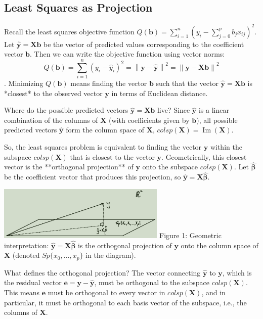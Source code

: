 \documentclass[11pt, letterpaper]{article}
\theoremstyle{definition}
\newcommand{\norm}[1]{\left\lVert#1\right\rVert}
\newcommand{\mat}[1]{\mathbf{#1}} %
\newcommand{\vect}[1]{\mathbf{#1}} %
\DeclareMathOperator{\im}{Im}       %
\begin{document}
\subsection{Least Squares as Projection}

Recall the least squares objective function $Q(\vect{b}) = \sum_{i=1}^{n} (y_i - \sum_{j=0}^{p} b_j x_{ij})^2$. Let $\hat{\vect{y}} = \mat{X}\vect{b}$ be the vector of predicted values corresponding to the coefficient vector $\vect{b}$. Then we can write the objective function using vector norms:
\[
Q(\vect{b}) = \sum_{i=1}^{n} (y_i - \hat{y}_i)^2 = \norm{\vect{y} - \hat{\vect{y}}}^2 = \norm{\vect{y} - \mat{X}\vect{b}}^2
\].
Minimizing $Q(\vect{b})$ means finding the vector $\vect{b}$ such that the vector $\hat{\vect{y}} = \mat{X}\vect{b}$ is *closest* to the observed vector $\vect{y}$ in terms of Euclidean distance.

Where do the possible predicted vectors $\hat{\vect{y}} = \mat{X}\vect{b}$ live? Since $\hat{\vect{y}}$ is a linear combination of the columns of $\mat{X}$ (with coefficients given by $\vect{b}$), all possible predicted vectors $\hat{\vect{y}}$ form the column space of $\mat{X}$, $colsp(\mat{X}) = \im(\mat{X})$.

So, the least squares problem is equivalent to finding the vector $\hat{\vect{y}}$ within the subspace $colsp(\mat{X})$ that is closest to the vector $\vect{y}$. Geometrically, this closest vector is the **orthogonal projection** of $\vect{y}$ onto the subspace $colsp(\mat{X})$. Let $\hat{\vect{\beta}}$ be the coefficient vector that produces this projection, so $\hat{\vect{y}} = \mat{X}\hat{\vect{\beta}}$.

\begin{center}
\includegraphics[width=0.6\textwidth]{image1.png}
Figure 1: Geometric interpretation: $\hat{\vect{y}} = \mat{X}\hat{\vect{\beta}}$ is the orthogonal projection of $\vect{y}$ onto the column space of $\mat{X}$ (denoted $Sp\{x_0, ..., x_p\}$ in the diagram).
\end{center}

What defines the orthogonal projection? The vector connecting $\hat{\vect{y}}$ to $\vect{y}$, which is the residual vector $\vect{e} = \vect{y} - \hat{\vect{y}}$, must be orthogonal to the subspace $colsp(\mat{X})$. This means $\vect{e}$ must be orthogonal to every vector in $colsp(\mat{X})$, and in particular, it must be orthogonal to each basis vector of the subspace, i.e., the columns of $\mat{X}$.
\end{document}
